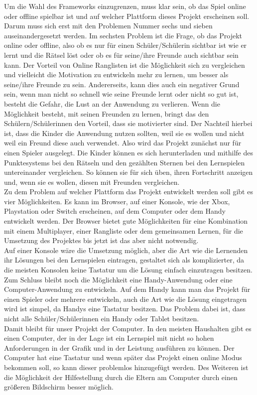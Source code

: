 Um die Wahl des Frameworks einzugrenzen, muss klar sein, ob das Spiel online oder offline spielbar ist und auf welcher Plattform dieses Projekt erscheinen soll.\\
Darum muss sich erst mit den Problemen Nummer sechs und sieben auseinandergesetzt werden.
Im sechsten Problem ist die Frage, ob das Projekt online oder offline, also ob es nur für einen Schüler/Schülerin sichtbar ist wie er lernt und die Rätsel löst oder ob es für seine/ihre Freunde auch sichtbar sein kann. Der Vorteil von Online Ranglisten ist die Möglichkeit sich zu vergleichen und vielleicht die Motivation zu entwickeln mehr zu lernen, um besser als seine/ihre Freunde zu sein. Andererseits, kann dies auch ein negativer Grund sein, wenn man  nicht so schnell wie seine Freunde lernt oder nicht so gut ist, besteht die Gefahr, die Lust an der Anwendung zu verlieren. Wenn die Möglichkeit besteht, mit seinen Freunden zu lernen, bringt das den Schülern/Schülerinnen den Vorteil, dass sie motivierter sind. Der Nachteil hierbei ist, dass die Kinder die Anwendung nutzen sollten, weil sie es wollen und nicht weil ein Freund diese auch verwendet. Also wird das Projekt zunächst nur für einen Spieler ausgelegt. Die Kinder können es sich herunterladen und mithilfe des Punktesystems bei den Rätseln und den gezählten Sternen bei den Lernspielen untereinander vergleichen. So können sie für sich üben, ihren Fortschritt anzeigen und, wenn sie es wollen, diesen mit Freunden vergleichen.\\
Zu dem Problem auf welcher Plattform das Projekt entwickelt werden soll gibt es vier Möglichkeiten. Es kann im Browser, auf einer Konsole, wie der Xbox, Playstation oder Switch erscheinen, auf dem Computer oder dem Handy entwickelt werden. Der Browser bietet gute Möglichkeiten für eine Kombination mit einem Multiplayer, einer Rangliste oder dem  gemeinsamen Lernen, für die Umsetzung des Projektes bis jetzt ist das aber nicht notwendig.\\
Auf einer Konsole wäre die Umsetzung möglich, aber die Art wie die Lernenden ihr Lösungen bei den Lernspielen eintragen, gestaltet sich als komplizierter, da die meisten Konsolen keine Tastatur um die Lösung einfach einzutragen besitzen. Zum Schluss bleibt noch die Möglichkeit eine Handy-Anwendung oder eine Computer-Anwendung zu entwickeln. Auf dem Handy kann man das Projekt für einen Spieler oder mehrere entwickeln, auch die Art wie die Lösung eingetragen wird ist simpel, da Handys eine Tastatur besitzen. Das Problem dabei ist, dass nicht alle Schüler/Schülerinnen ein Handy oder Tablet besitzen.\\
Damit bleibt für unser Projekt der Computer. In den meisten Haushalten gibt es einen Computer, der in der Lage ist ein Lernspiel mit nicht so hohen Anforderungen in der Grafik und in der Leistung ausführen zu können. Der Computer hat eine Tastatur und wenn später das Projekt einen online Modus bekommen soll, so kann dieser problemlos hinzugefügt werden. Des Weiteren ist die Möglichkeit der Hilfestellung durch die Eltern am Computer durch einen größeren Bildschirm besser möglich.


